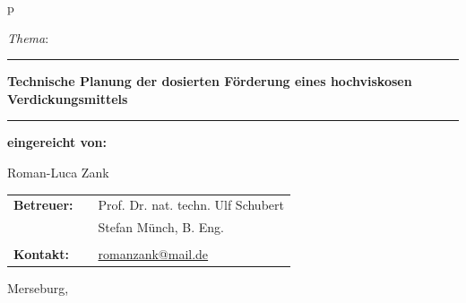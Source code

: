 \begin{center}
\begin{tabular}{p{\textwidth}}
\vspace*{5.5mm}

\begin{center}
	\LARGE{\textit{Thema}:}
\end{center}

\vspace{-5.5mm}

\rule{\textwidth}{0.4pt}
\begin{center}
\textbf{\LARGE{Technische Planung der dosierten Förderung eines hochviskosen Verdickungsmittels}}
\end{center}
\vspace*{-5mm}
\rule{\textwidth}{0.4pt}

\vspace*{13.5mm}

\begin{center}
\Large{\textbf{eingereicht von:}} \\ 
\end{center}
\begin{center}
\Large{Roman-Luca Zank} \\
\end{center}


\vspace*{13.5mm}

\begin{center}
\begin{tabular}{lll}
\Large{\textbf{Betreuer:}}&& \Large{Prof. Dr. nat. techn. Ulf Schubert}\\
&& \Large{Stefan Münch, B. Eng.}\\
&&\\
\Large{\textbf{Kontakt:}}&& \Large{\href{mailto:romanzank@mail.de}{romanzank@mail.de} }\\
\end{tabular}
\end{center}

\end{tabular}
\end{center}

\vfill

\large{Merseburg, \todayDE}

\cleardoubleoddpage
